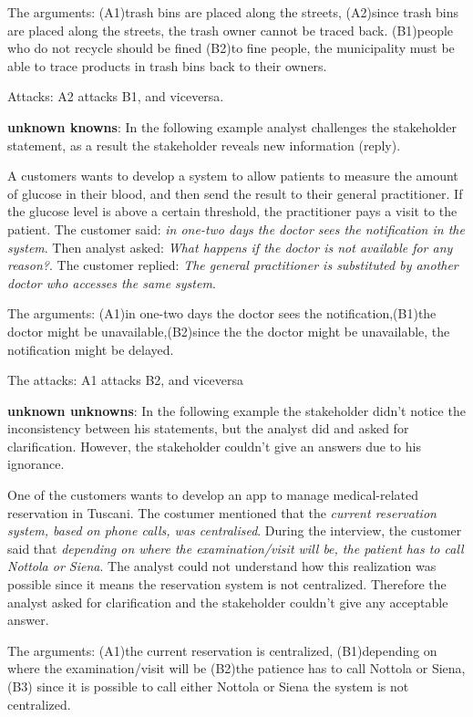 \documentclass[]{llncs}
\begin{document}
The arguments: (A1)trash bins are placed along the streets, (A2)since
trash bins are placed along the streets, the trash owner cannot be
traced back. (B1)people who do not recycle should be fined (B2)to fine
people, the municipality must be able to trace products in trash bins
back to their owners.

Attacks: A2 attacks B1, and viceversa.

\textbf{unknown knowns}: In the following example analyst challenges the
stakeholder statement, as a result the stakeholder reveals new
information (reply).

A customers wants to develop a system to allow patients to measure the
amount of glucose in their blood, and then send the result to their
general practitioner. If the glucose level is above a certain threshold,
the practitioner pays a visit to the patient. The customer said:
\emph{in one-two days the doctor sees the notification in the system}.
Then analyst asked: \emph{What happens if the doctor is not available
for any reason?}. The customer replied: \emph{The general practitioner
is substituted by another doctor who accesses the same system}.

The arguments: (A1)in one-two days the doctor sees the
notification,(B1)the doctor might be unavailable,(B2)since the the
doctor might be unavailable, the notification might be delayed.

The attacks: A1 attacks B2, and viceversa

\textbf{unknown unknowns}: In the following example the stakeholder
didn't notice the inconsistency between his statements, but the analyst
did and asked for clarification. However, the stakeholder couldn't give
an answers due to his ignorance.

One of the customers wants to develop an app to manage medical-related
reservation in Tuscani. The costumer mentioned that the \emph{current
reservation system, based on phone calls, was centralised}. During the
interview, the customer said that \emph{depending on where the
examination/visit will be, the patient has to call Nottola or Siena}.
The analyst could not understand how this realization was possible since
it means the reservation system is not centralized. Therefore the
analyst asked for clarification and the stakeholder couldn't give any
acceptable answer.

The arguments: (A1)the current reservation is centralized, (B1)depending
on where the examination/visit will be (B2)the patience has to call
Nottola or Siena, (B3) since it is possible to call either Nottola or
Siena the system is not centralized.
\end{document}
